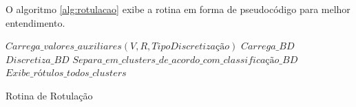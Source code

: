 O algoritmo \ref{alg:rotulacao} exibe a rotina em forma de pseudocódigo para melhor entendimento.

\IncMargin{1em}
\begin{algorithm}[h]

\nl $Carrega\_valores\_auxiliares(V,R,TipoDiscretização)$\;
\nl $Carrega\_BD$\; 
\nl $Discretiza\_BD$\; 
\nl $Separa\_em\_clusters\_de\_acordo\_com\_classificação\_BD$\; 
\nl {}
 \nl $Exibe\_rótulos\_todos\_clusters$\; 
 \caption{Rotina de Rotulação}\label{alg:rotulacao}
 
\end{algorithm}
\DecMargin{1em}
        
